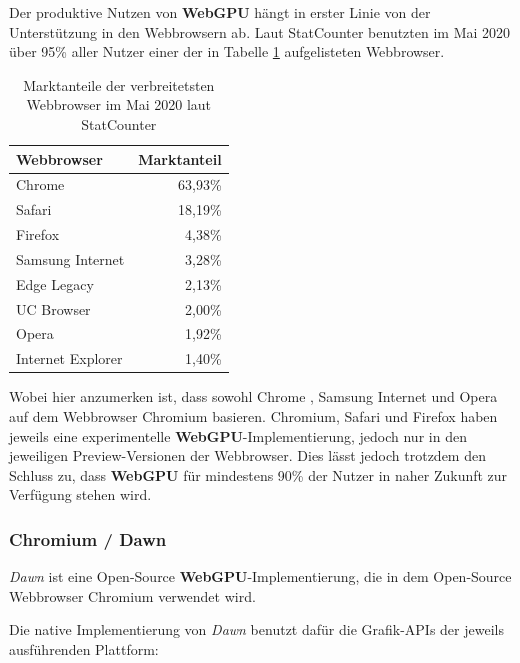 \documentclass[oneside]{ausarbeitung}
\newcommand*{\quotize}[1]{\glqq #1\grqq}
\begin{document}
Der produktive Nutzen von \textbf{WebGPU} hängt in erster Linie von der Unterstützung in den Webbrowsern ab. Laut StatCounter \cite{statcounter:browser} benutzten im Mai 2020 über 95\% aller Nutzer einer der in Tabelle \ref{tab:browser_share} aufgelisteten Webbrowser.

\begin{table}[htb]
\begin{center}
\begin{tabular} { |l|r| }
  \hline
  \textbf{Webbrowser} & \textbf{Marktanteil} \\
  \hline
  Chrome & 63,93\% \\
  \hline
  Safari & 18,19\% \\
  \hline
  Firefox & 4,38\% \\
  \hline
  Samsung Internet & 3,28\%\\
  \hline
  Edge Legacy & 2,13\%\\
  \hline
  UC Browser & 2,00\% \\
  \hline
  Opera & 1,92\% \\
  \hline
  Internet Explorer & 1,40\% \\
  \hline
\end{tabular}
\end{center}
\caption{Marktanteile der verbreitetsten Webbrowser im Mai 2020 laut StatCounter \cite{statcounter:browser}}
\label{tab:browser_share}
\end{table}

Wobei hier anzumerken ist, dass sowohl Chrome \cite{wikipedia:google_chrome}, Samsung Internet \cite{wikipedia:samsung_internet} und Opera \cite{wikipedia:opera} auf dem Webbrowser Chromium basieren. Chromium, Safari und Firefox haben jeweils eine experimentelle \textbf{WebGPU}-Implementierung, jedoch nur in den jeweiligen Preview-Versionen der Webbrowser. Dies lässt jedoch trotzdem den Schluss zu, dass \textbf{WebGPU} für mindestens 90\% der Nutzer in naher Zukunft zur Verfügung stehen wird.

\subsubsection{Chromium \cite{chromium} / Dawn \cite{google:dawn}}
\textit{Dawn} ist eine Open-Source \textbf{WebGPU}-Implementierung, die in dem Open-Source Webbrowser Chromium verwendet wird. 

Die \quotize{native} Implementierung von \textit{Dawn} benutzt dafür die Grafik-APIs der jeweils ausführenden Plattform:
\end{document}
